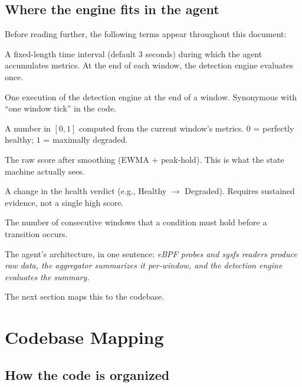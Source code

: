 \documentclass[11pt]{article}
\begin{document}
\subsection{Where the engine fits in the agent}

Before reading further, the following terms appear throughout this document:

\begin{defbox}
\begin{description}[leftmargin=1.5cm,style=nextline]
  \item[Window] A fixed-length time interval (default 3 seconds) during which
    the agent accumulates metrics. At the end of each window, the detection
    engine evaluates once.
  \item[Evaluation cycle] One execution of the detection engine at the end of
    a window. Synonymous with ``one window tick'' in the code.
  \item[Raw score] A number in $[0, 1]$ computed from the current window's
    metrics. $0$ = perfectly healthy; $1$ = maximally degraded.
  \item[Effective score] The raw score after smoothing (EWMA + peak-hold).
    This is what the state machine actually sees.
  \item[State transition] A change in the health verdict (e.g., Healthy
    $\rightarrow$ Degraded). Requires sustained evidence, not a single high
    score.
  \item[Dwell] The number of consecutive windows that a condition must hold
    before a transition occurs.
\end{description}
\end{defbox}

The agent's architecture, in one sentence: \emph{eBPF probes and sysfs
readers produce raw data, the aggregator summarizes it per-window, and the
detection engine evaluates the summary.}

The next section maps this to the codebase.


\section{Codebase Mapping}
\label{sec:codebase}

\subsection{How the code is organized}
\end{document}
